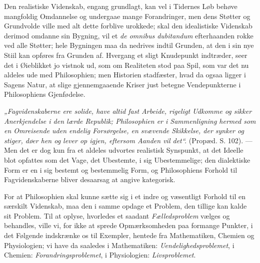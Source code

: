\documentclass[12pt,a4paper]{book}
\begin{document}
Den realistiske Videnskab, engang grundlagt, kan vel i Tidernes Løb
behøve mangfoldig Omdannelse og undergaae mange Forandringer, men dens
Støtter og Grundvolde ville med alt dette forblive urokkede; skal den
idealistiske Videnskab derimod omdanne sin Bygning, vil et
\textit{de omnibus dubitandum} efterhaanden rokke ved alle Støtter;
hele Bygningen maa da nedrives indtil Grunden, at den i sin nye Stiil
kan opføres fra Grunden af. Hvergang et sligt Knudepunkt indtræder,
seer det i Øieblikket jo vistnok ud, som om Realiteten stod paa Spil,
som var det nu aldeles ude med Philosophien; men Historien stadfæster,
hvad da ogsaa ligger i Sagens Natur, at slige gjennemgaaende Kriser
just betegne Vendepunkterne i Philosophiens Gjenfødelse.

\emph{„Fagvidenskaberne ere solide, have altid fast Arbeide, rigeligt
Udkomme og sikker Anerkjendelse i den lærde Republik; Philosophien er
i Sammenligning hermed som en Omreisende uden endelig Forsørgelse, en
svævende Skikkelse, der synker og stiger, døer hen og lever op igjen,
eftersom Aanden vil det“.} (Propæd. S. 102). --- Men det er dog kun
fra et aldeles udvortes realistisk Synspunkt, at det Ideelle blot
opfattes som det Vage, det Ubestemte, i sig Ubestemmelige; den
dialektiske Form er en i sig bestemt og bestemmelig Form, og
Philosophiens Forhold til Fagvidenskaberne bliver desaarsag at angive
kategorisk.

For at Philosophien skal kunne sætte sig i et indre og væsentligt
Forhold til en særskilt Videnskab, maa den i samme opdage et Problem,
den tillige kan kalde sit Problem. Til at oplyse, hvorledes et
saadant \emph{Fælledsproblem} vælges og behandles, ville vi, for ikke
at sprede Opmærksomheden paa formange Punkter, i det Følgende
indskrænke os til Exempler, hentede fra Mathematiken, Chemien og
Physiologien; vi have da saaledes i Mathematiken:
\emph{Uendelighedsproblemet}, i Chemien: \emph{Forandringsproblemet},
i Physiologien: \emph{Livsproblemet}.
\end{document}
